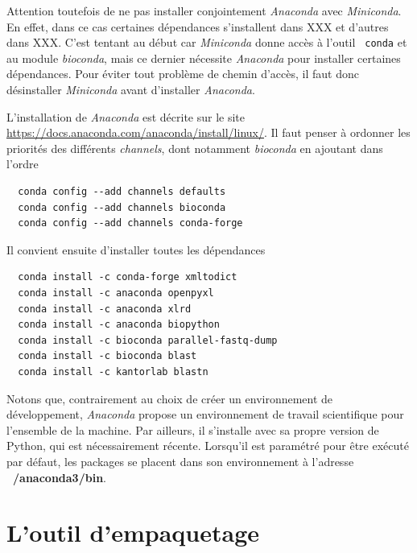 \documentclass[twoside,a4paper,11pt,frenchb,openany]{report}
\begin{document}
Attention toutefois de ne pas installer conjointement \textit{Anaconda} avec \textit{Miniconda}. En effet, dans ce cas certaines dépendances s'installent dans XXX et d'autres dans XXX. C'est tentant au début car \textit{Miniconda} donne accès à l'outil \texttt{  conda} et au module \textit{bioconda}, mais ce dernier nécessite \textit{Anaconda} pour installer certaines dépendances. Pour éviter tout problème de chemin d'accès, il faut donc désinstaller \textit{Miniconda} avant d'installer \textit{Anaconda}. 

L'installation de \textit{Anaconda} est décrite sur le site \url{https://docs.anaconda.com/anaconda/install/linux/}. Il faut penser à ordonner les priorités des différents \textit{channels}, dont notamment \textit{bioconda} en ajoutant dans l'ordre

\begin{verbatim}
  conda config --add channels defaults
  conda config --add channels bioconda
  conda config --add channels conda-forge
\end{verbatim}

 Il convient ensuite d'installer toutes les dépendances 
\begin{verbatim}  conda install -c conda-forge xmltodict
  conda install -c anaconda openpyxl
  conda install -c anaconda xlrd
  conda install -c anaconda biopython
  conda install -c bioconda parallel-fastq-dump
  conda install -c bioconda blast
  conda install -c kantorlab blastn\end{verbatim}

Notons que, contrairement au choix de créer un environnement de développement, \textit{Anaconda} propose un environnement de travail scientifique pour l'ensemble de la machine. Par ailleurs, il s'installe avec sa propre version de Python, qui est nécessairement récente. Lorsqu'il est paramétré pour être exécuté par défaut, les packages se placent dans son environnement à l'adresse \textbf{~/anaconda3/bin}.




\section{L'outil d'empaquetage}
	
\end{document}
